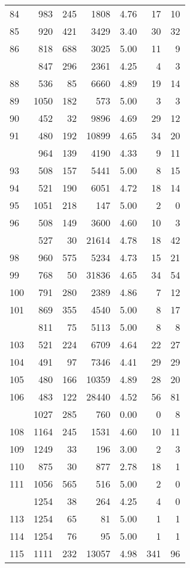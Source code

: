 \documentclass[
]{article}
\begin{document}
\begin{table}
\begin{tabular}[t]{lrrrrrr}
84 & 983 & 245 & 1808 & 4.76 & 17 & 10\\
85 & 920 & 421 & 3429 & 3.40 & 30 & 32\\
86 & 818 & 688 & 3025 & 5.00 & 11 & 9\\
\addlinespace
87 & 847 & 296 & 2361 & 4.25 & 4 & 3\\
88 & 536 & 85 & 6660 & 4.89 & 19 & 14\\
89 & 1050 & 182 & 573 & 5.00 & 3 & 3\\
90 & 452 & 32 & 9896 & 4.69 & 29 & 12\\
91 & 480 & 192 & 10899 & 4.65 & 34 & 20\\
\addlinespace
92 & 964 & 139 & 4190 & 4.33 & 9 & 11\\
93 & 508 & 157 & 5441 & 5.00 & 8 & 15\\
94 & 521 & 190 & 6051 & 4.72 & 18 & 14\\
95 & 1051 & 218 & 147 & 5.00 & 2 & 0\\
96 & 508 & 149 & 3600 & 4.60 & 10 & 3\\
\addlinespace
97 & 527 & 30 & 21614 & 4.78 & 18 & 42\\
98 & 960 & 575 & 5234 & 4.73 & 15 & 21\\
99 & 768 & 50 & 31836 & 4.65 & 34 & 54\\
100 & 791 & 280 & 2389 & 4.86 & 7 & 12\\
101 & 869 & 355 & 4540 & 5.00 & 8 & 17\\
\addlinespace
102 & 811 & 75 & 5113 & 5.00 & 8 & 8\\
103 & 521 & 224 & 6709 & 4.64 & 22 & 27\\
104 & 491 & 97 & 7346 & 4.41 & 29 & 29\\
105 & 480 & 166 & 10359 & 4.89 & 28 & 20\\
106 & 483 & 122 & 28440 & 4.52 & 56 & 81\\
\addlinespace
107 & 1027 & 285 & 760 & 0.00 & 0 & 8\\
108 & 1164 & 245 & 1531 & 4.60 & 10 & 11\\
109 & 1249 & 33 & 196 & 3.00 & 2 & 3\\
110 & 875 & 30 & 877 & 2.78 & 18 & 1\\
111 & 1056 & 565 & 516 & 5.00 & 2 & 0\\
\addlinespace
112 & 1254 & 38 & 264 & 4.25 & 4 & 0\\
113 & 1254 & 65 & 81 & 5.00 & 1 & 1\\
114 & 1254 & 76 & 95 & 5.00 & 1 & 1\\
115 & 1111 & 232 & 13057 & 4.98 & 341 & 96\\

\end{tabular}
\end{table}
\end{document}
